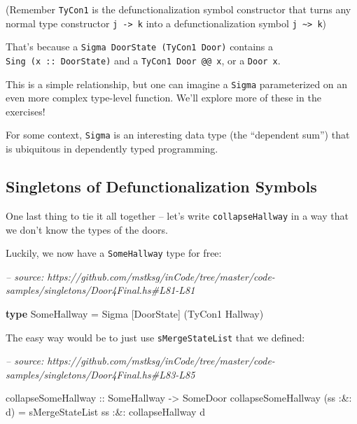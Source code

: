 \documentclass[]{article}
\newenvironment{Shaded}{}{}
\newcommand{\CommentTok}[1]{\textcolor[rgb]{0.38,0.63,0.69}{\textit{#1}}}
\newcommand{\DataTypeTok}[1]{\textcolor[rgb]{0.56,0.13,0.00}{#1}}
\newcommand{\FunctionTok}[1]{\textcolor[rgb]{0.02,0.16,0.49}{#1}}
\newcommand{\KeywordTok}[1]{\textcolor[rgb]{0.00,0.44,0.13}{\textbf{#1}}}
\newcommand{\NormalTok}[1]{#1}
\newcommand{\OtherTok}[1]{\textcolor[rgb]{0.00,0.44,0.13}{#1}}
\begin{document}
(Remember \texttt{TyCon1} is the defunctionalization symbol constructor that
turns any normal type constructor \texttt{j\ -\textgreater{}\ k} into a
defunctionalization symbol \texttt{j\ \textasciitilde{}\textgreater{}\ k})

That's because a \texttt{Sigma\ DoorState\ (TyCon1\ Door)} contains a
\texttt{Sing\ (x\ ::\ DoorState)} and a \texttt{TyCon1\ Door\ @@\ x}, or a
\texttt{Door\ x}.

This is a simple relationship, but one can imagine a \texttt{Sigma}
parameterized on an even more complex type-level function. We'll explore more of
these in the exercises!

For some context, \texttt{Sigma} is an interesting data type (the ``dependent
sum'') that is ubiquitous in dependently typed programming.

\hypertarget{singletons-of-defunctionalization-symbols}{%
\subsection{Singletons of Defunctionalization
Symbols}\label{singletons-of-defunctionalization-symbols}}

One last thing to tie it all together -- let's write \texttt{collapseHallway} in
a way that we don't know the types of the doors.

Luckily, we now have a \texttt{SomeHallway} type for free:

\begin{Shaded}
\begin{Highlighting}[]
\CommentTok{-- source: https://github.com/mstksg/inCode/tree/master/code-samples/singletons/Door4Final.hs#L81-L81}

\KeywordTok{type} \DataTypeTok{SomeHallway} \FunctionTok{=} \DataTypeTok{Sigma}\NormalTok{ [}\DataTypeTok{DoorState}\NormalTok{] (}\DataTypeTok{TyCon1} \DataTypeTok{Hallway}\NormalTok{)}
\end{Highlighting}
\end{Shaded}

The easy way would be to just use \texttt{sMergeStateList} that we defined:

\begin{Shaded}
\begin{Highlighting}[]
\CommentTok{-- source: https://github.com/mstksg/inCode/tree/master/code-samples/singletons/Door4Final.hs#L83-L85}

\OtherTok{collapseSomeHallway ::} \DataTypeTok{SomeHallway} \OtherTok{->} \DataTypeTok{SomeDoor}
\NormalTok{collapseSomeHallway (ss }\FunctionTok{:&:}\NormalTok{ d) }\FunctionTok{=}\NormalTok{ sMergeStateList ss}
                             \FunctionTok{:&:}\NormalTok{ collapseHallway d}
\end{Highlighting}
\end{Shaded}
\end{document}
